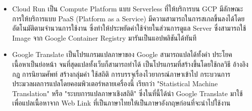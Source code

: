 \documentclass[12pt,oneside,openright,a4paper]{cpe-thai-project}
\begin{document}
\begin{itemize}
      \item Cloud Run
      \hspace{1cm}เป็น Compute Platform แบบ Serverless ที่ให้บริการบน GCP มีลักษณะการให้บริการแบบ PaaS (Platform as a Service) 
      มีความสามารถในการสเกลขึ้นลงได้โดยอัตโนมัติตามจำนวนการใช้งาน 
      ซึ่งทำให้ประหยัดค่าใช้จ่ายในส่วนการดูแล Server ซึ่งสามารถใช้ Image จาก Google Container Registry มารันเป็นแอปพลิชันได้ทันที \cite{cloud_run}

      \item Google Translate
      \hspace{1cm}เป็นโปรแกรมแปลภาษาของ Google สามารถแปลได้ทั้งคำ ประโยค เนื้อหาเป็นย่อหน้า จนที่สุดแปลทั้งเว็บก็สามารถทำได้
      เป็นโปรแกรมที่สร้างขึ้นโดยใช้กลวิธี อ้างอิงกฎ การนิยามศัพท์ สร้างกลุ่มคำ ใช้สถิติ การบรรจุเรื่องไวยากรณ์ภาษาเข้าไป 
      กระบวนการประมวลผลการแปลโดยคอมพิวเตอร์หลายเครื่องนี้ เรียกว่า "Statistical Machine Translation" หรือ "ระบบการแปลภาษาเชิงสถิติ" \cite{gg_tran}
      ซึ่งในที่นี้ได้นำ Google Translate มาใช้เพื่อแปลเนื้อหาจาก Web Link ที่เป็นภาษาไทยให้เป็นภาษาอังกฤษก่อนที่จะนำไปใช้งาน
    \end{itemize}
\end{document}
